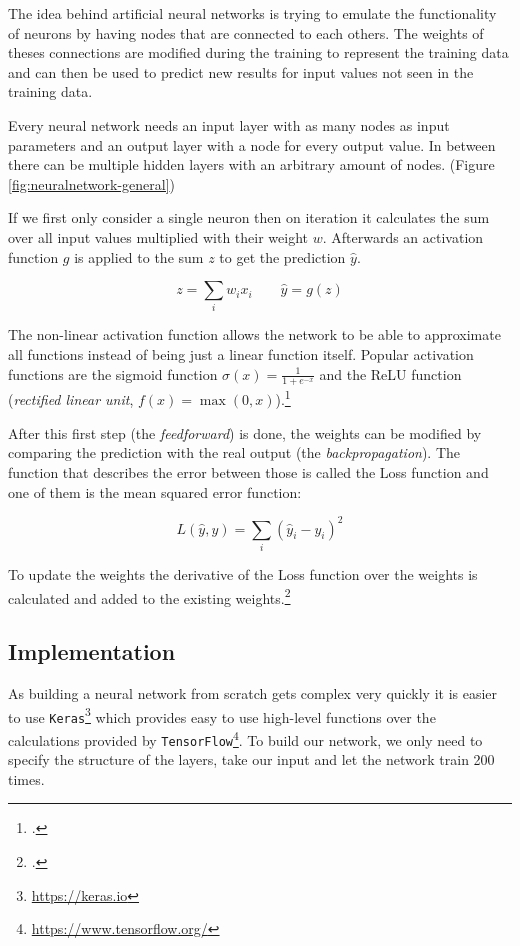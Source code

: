 The idea behind artificial neural networks is trying to emulate the functionality of neurons by having nodes that are connected to each others. The weights of theses connections are modified during the training to represent the training data and can then be used to predict new results for input values not seen in the training data.

Every neural network needs an input layer with as many nodes as input parameters and an output layer with a node for every output value. In between there can be multiple hidden layers with an arbitrary amount of nodes. (Figure \ref{fig:neuralnetwork-general})

If we first only consider a single neuron then on iteration it calculates the sum over all input values multiplied with their weight $w$. Afterwards an activation function $g$ is applied to the sum $z$ to get the prediction $\hat{y}$.

\begin{equation}
	z=\sum_{i}w_ix_i \qquad \hat{y}=g(z)
\end{equation}

The non-linear activation function allows the network to be able to approximate all functions instead of being just a linear function itself. Popular activation functions are the sigmoid function $\sigma(x)={\frac {1}{1+e^{-x}}}$ and the ReLU function (\textit{rectified linear unit}, $f(x)=\max(0,x)$).\footcite{NN-math}

After this first step (the \textit{feedforward}) is done, the weights can be modified by comparing the prediction with the real output (the \textit{backpropagation}). The function that describes the error between those is called the Loss function and one of them is the mean squared error function:

\begin{equation}
	L(\hat{y},y)=\sum_{i}(\hat{y}_i-y_i)^2
\end{equation}

To update the weights the derivative of the Loss function over the weights is calculated and added to the existing weights.\footcite{NN-python}



\subsection{Implementation}

As building a neural network from scratch gets complex very quickly it is easier to use \texttt{Keras}\footnote{\url{https://keras.io}} which provides easy to use high-level functions over the calculations provided by \texttt{TensorFlow}\footnote{\url{https://www.tensorflow.org/}}. To build our network, we only need to specify the structure of the layers, take our input and let the network train 200 times.

